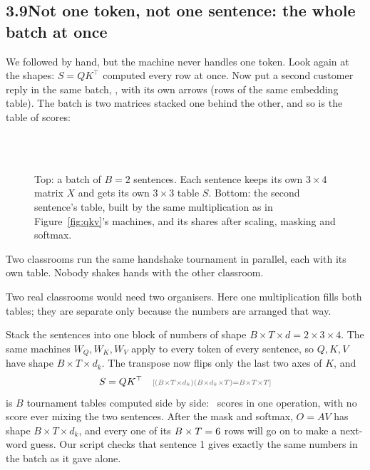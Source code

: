 
\subsection*{3.9\quad Not one token, not one sentence: the whole batch at once}

We followed  by hand, but the machine never handles one token. Look again at the shapes: $S=QK^\top$
computed every row at once. Now put a second customer reply in the same batch, , with its own
arrows (rows of the same embedding table). The batch is two matrices stacked one behind the other, and so is
the table of scores:
\begin{figure}[!htb]\centering
\\[14pt]
\\[10pt]

\caption{Top: a batch of $B=2$ sentences. Each sentence keeps its own $3\times4$ matrix $X$ and gets its own
$3\times3$ table $S$. Bottom: the second sentence's table, built by the same multiplication as in
Figure~\ref{fig:qkv}'s machines, and its shares after scaling, masking and softmax.}
\end{figure}

\Picture Two classrooms run the same handshake tournament in parallel, each with its own table. Nobody shakes hands with
the other classroom.

\begin{breaks}
Two real classrooms would need two organisers. Here one multiplication fills both tables; they are separate only
because the numbers are arranged that way.
\end{breaks}

\Exactly Stack the sentences into one block of numbers of shape $B\times T\times d = 2\times3\times4$. The same
machines $W_Q, W_K, W_V$ apply to every token of every sentence, so $Q, K, V$ have shape $B\times T\times d_k$. The
transpose now flips only the last two axes of $K$, and
\[
S = QK^\top \shape{(B\times T\times d_k)(B\times d_k\times T) = B\times T\times T}
\]
is $B$ tournament tables computed side by side: \nScores\ scores in one operation, with no score ever mixing the two
sentences. After the mask and softmax, $O=AV$ has shape $B\times T\times d_k$, and every one of its $B\times T =
6$ rows will go on to make a next-word guess. Our script checks that sentence 1 gives exactly the same numbers
in the batch as it gave alone.

